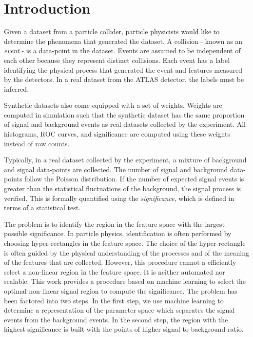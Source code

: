 \documentclass{article}
\begin{document}
\section{Introduction}
\label{sec:introduction}
Given a dataset from a particle collider, particle physicists would like to determine the phenomena that generated the dataset. A collision  - known as an \textit{event} - is a data-point in the dataset. Events are assumed to be independent of each other because they represent distinct collisions. Each event has a label identifying the physical process that generated the event and features measured by the detectors. In a real dataset from the ATLAS detector, the labels must be inferred.

Synthetic datasets also come equipped with a set of weights. Weights are computed in simulation such that the synthetic dataset has the same proportion of signal and background events as real datasets collected by the experiment. All histograms, ROC curves, and significance are computed using these weights instead of raw counts.

Typically, in a real dataset collected by the experiment, a mixture of background and signal data-points are collected. The number of signal and background data-points follow the Poisson distribution. If the number of expected signal events is greater than the statistical fluctuations of the background, the signal process is verified. This is formally quantified using the \textit{significance}, which is defined in terms of a statistical test. 

The problem is to identify the region in the feature space with the largest possible significance. In particle physics, identification is often performed by choosing hyper-rectangles in the feature space. The choice of the hyper-rectangle is often guided by the physical understanding of the processes and of the meaning of the features that are collected.
However, this procedure cannot a efficiently select a non-linear region in the feature space. It is neither automated nor scalable. This work provides a procedure based on machine learning to select the optimal non-linear signal region to compute the significance.
The problem has been factored into two steps. In the first step, we use machine learning to determine a representation of the parameter space which separates the signal events from the background events. In the second step, the region with the highest significance is built with the points of higher signal to background ratio.
\end{document}

